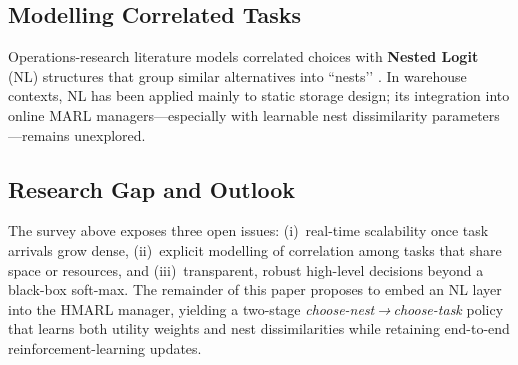 \documentclass[journal]{IEEEtran}
\begin{document}
\subsection{Modelling Correlated Tasks}
Operations-research literature models correlated choices with \textbf{Nested Logit} (NL) structures that group similar alternatives into “nests’’ \citep{train2009discrete}.  
In warehouse contexts, NL has been applied mainly to static storage design; its integration into online MARL managers—especially with learnable nest dissimilarity parameters—remains unexplored.

\subsection{Research Gap and Outlook}
The survey above exposes three open issues:  
(i)~real-time scalability once task arrivals grow dense,  
(ii)~explicit modelling of correlation among tasks that share space or resources, and  
(iii)~transparent, robust high-level decisions beyond a black-box soft-max.  
The remainder of this paper proposes to embed an NL layer into the HMARL manager, yielding a two-stage \textit{choose-nest → choose-task} policy that learns both utility weights and nest dissimilarities while retaining end-to-end reinforcement-learning updates.
\end{document}
